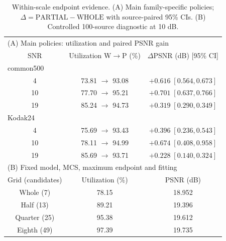 \begin{table}[t]
\caption{Within-scale endpoint evidence. (A) Main family-specific policies; $\Delta=\mathrm{PARTIAL}-\mathrm{WHOLE}$ with source-paired 95\% CIs. (B) Controlled 100-source diagnostic at 10 dB.}
\label{tab:internal}
\centering\footnotesize
\setlength{\tabcolsep}{3pt}
\begin{tabular}{ccc}
\toprule
\multicolumn{3}{l}{(A) Main policies: utilization and paired PSNR gain} \\
SNR & Utilization W$\to$P (\%) & $\Delta$PSNR (dB) [95\% CI] \\
\midrule
\multicolumn{3}{l}{common500} \\
4 & 73.81 $\to$ 93.08 & $+0.616\;[0.564,0.673]$ \\
10 & 77.70 $\to$ 95.21 & $+0.701\;[0.637,0.766]$ \\
19 & 85.24 $\to$ 94.73 & $+0.319\;[0.290,0.349]$ \\
\multicolumn{3}{l}{Kodak24} \\
4 & 75.69 $\to$ 93.43 & $+0.396\;[0.236,0.543]$ \\
10 & 78.11 $\to$ 94.99 & $+0.674\;[0.408,0.958]$ \\
19 & 85.69 $\to$ 93.71 & $+0.228\;[0.140,0.324]$ \\
\midrule
\multicolumn{3}{l}{(B) Fixed model, MCS, maximum endpoint and fitting} \\
Grid (candidates) & Utilization (\%) & PSNR (dB) \\
Whole (7) & 78.15 & 18.952 \\
Half (13) & 89.21 & 19.396 \\
Quarter (25) & 95.38 & 19.612 \\
Eighth (49) & 97.39 & 19.735 \\
\bottomrule
\end{tabular}
\end{table}
